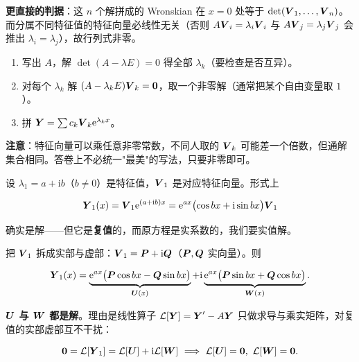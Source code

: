\documentclass[11pt]{ctexart}
\begin{document}
\textbf{更直接的判据}：这 $n$ 个解拼成的 Wronskian 在 $x=0$ 处等于 $\det(\boldsymbol{V}_1,\dots,\boldsymbol{V}_n)$。而分属不同特征值的特征向量必线性无关（否则 $A\boldsymbol{V}_i=\lambda_i\boldsymbol{V}_i$ 与 $A\boldsymbol{V}_j=\lambda_j\boldsymbol{V}_j$ 会推出 $\lambda_i=\lambda_j$），故行列式非零。


\begin{enumerate}
  \item 写出 $A$，解 $\det(A-\lambda E)=0$ 得全部 $\lambda_k$（要检查是否互异）。
  \item 对每个 $\lambda_k$ 解 $(A-\lambda_kE)\boldsymbol{V}_k=\boldsymbol{0}$，取一个非零解（通常把某个自由变量取 $1$）。
  \item 拼 $\boldsymbol{Y}=\sum c_k\boldsymbol{V}_k\mathrm{e}^{\lambda_k x}$。
\end{enumerate}

\textbf{注意}：特征向量可以乘任意非零常数，不同人取的 $\boldsymbol{V}_k$ 可能差一个倍数，但通解集合相同。答卷上不必统一"最美"的写法，只要非零即可。



设 $\lambda_1=a+\mathrm{i}b$（$b\neq0$）是特征值，$\boldsymbol{V}_1$ 是对应特征向量。形式上

\[
\boldsymbol{Y}_1(x)=\boldsymbol{V}_1\mathrm{e}^{(a+\mathrm{i}b)x}
=\mathrm{e}^{ax}\bigl(\cos bx+\mathrm{i}\sin bx\bigr)\boldsymbol{V}_1
\]

确实是解——但它是\textbf{复值}的，而原方程是实系数的，我们要实值解。


把 $\boldsymbol{V}_1$ 拆成实部与虚部：$\boldsymbol{V}_1=\boldsymbol{P}+\mathrm{i}\boldsymbol{Q}$（$\boldsymbol{P},\boldsymbol{Q}$ 实向量）。则

\[
\boldsymbol{Y}_1(x)=\underbrace{\mathrm{e}^{ax}\bigl(\boldsymbol{P}\cos bx-\boldsymbol{Q}\sin bx\bigr)}_{\boldsymbol{U}(x)}
+\mathrm{i}\underbrace{\mathrm{e}^{ax}\bigl(\boldsymbol{P}\sin bx+\boldsymbol{Q}\cos bx\bigr)}_{\boldsymbol{W}(x)}.
\]

\textbf{$\boldsymbol{U}$ 与 $\boldsymbol{W}$ 都是解}。理由是线性算子 $\mathcal{L}[\boldsymbol{Y}]=\boldsymbol{Y}'-A\boldsymbol{Y}$ 只做求导与乘实矩阵，对复值的实部虚部互不干扰：

\[
\vect{0}=\mathcal{L}[\vect{Y}_1]=\mathcal{L}[\vect{U}]+\mathrm{i}\mathcal{L}[\vect{W}]
\ \Longrightarrow\ \mathcal{L}[\vect{U}]=\vect{0},\ \mathcal{L}[\vect{W}]=\vect{0}.
\]
\end{document}
